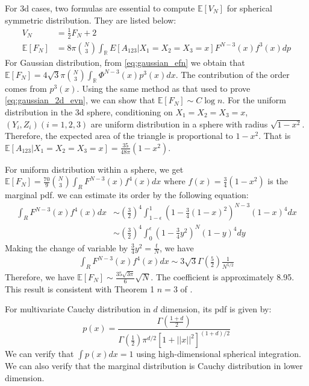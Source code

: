 \documentclass{article}
\def\E{\mathbb{E}}
\def\R{\mathbb{R}}
\begin{document}
For 3d cases, two formulas are essential to compute $\E[V_N]$
for spherical symmetric distribution.
They are listed below:
\begin{align}
    V_N &= \frac{1}{2} F_N + 2 \\
    \E[F_N]&=8\pi \binom{N}{3}
    \int_{\R} 
    E[A_{123}|X_1=X_2=X_3=x] F^{N-3}(x)
    f^3(x) dp\label{eq:gaussian_efn}
\end{align}
For Gaussian distribution, from \eqref{eq:gaussian_efn}
we obtain that $\E[F_N]
= 4\sqrt{3}\pi \binom{N}{3}\int_{\R} \Phi^{N-3}(x)p^3(x)dx$.
The contribution of the order comes from $p^3(x)$.
Using the same method as that used to prove \eqref{eq:gaussian_2d_evn},
we can show that
$\E[F_N] \sim C\log n$. For the uniform
distribution in the 3d sphere, conditioning on $X_1=X_2=X_3=x$,
$(Y_i, Z_i) (i=1,2,3)$
are uniform distribution in a sphere with
radius $\sqrt{1-x^2}$. Therefore, the expected
area of the triangle is proportional to $1-x^2$.
That is
$\E[A_{123}|X_1=X_2=X_3=x] = \frac{35}{48 \pi}(1-x^2)$.

For uniform distribution
within a sphere,
we get
$\E[F_N]
=\frac{70}{9}
\binom{N}{3}
\int_R F^{N-3}(x)f^4(x)dx$
where $f(x)=\frac{3}{4}(1-x^2)$ is the
marginal pdf.
we can estimate its order by
the following equation:
\begin{align*}
    \int_R F^{N-3}(x)f^4(x)dx
    &\sim (\frac{3}{2})^4
    \int_{1-\epsilon}^{1}
    (1-\frac{3}{4}(1-x)^2)^{N-3}
    (1-x)^4dx \\
    &\sim  (\frac{3}{2})^4
    \int_{0}^{\epsilon}
    (1-\frac{3}{4}y^2)^{N}
    (1-y)^4dy
\end{align*}
Making the change of variable by $\frac{3}{4}y^2=\frac{t}{N}$,
we have
\begin{align*}
    \int_R F^{N-3}(x)f^4(x)dx
    \sim 3\sqrt{3}\Gamma(\frac{5}{2})\frac{1}{N^{5/2}}
\end{align*}
Therefore, we have
$\E[F_N] \sim \frac{35\sqrt{3\pi}}{6}\sqrt{N}$.
The coefficient is approximately 8.95.
This result is consistent with
Theorem 1 $n=3$ of \cite{raynaud1970enveloppe}.

For multivariate Cauchy distribution in $d$
dimension, its pdf is given by:
\begin{equation}\label{eq:cauchy_d_dim}
    p(x) = \frac{\Gamma(\frac{1+d}{2})}{\Gamma(\frac{1}{2})\pi^{d/2}
    [1+||x||^2]^{(1+d)/2}}
\end{equation}
We can verify that $\int p(x)dx=1$
using high-dimensional spherical integration.
We can also verify that the marginal distribution is Cauchy
distribution in lower dimension.
\end{document}
